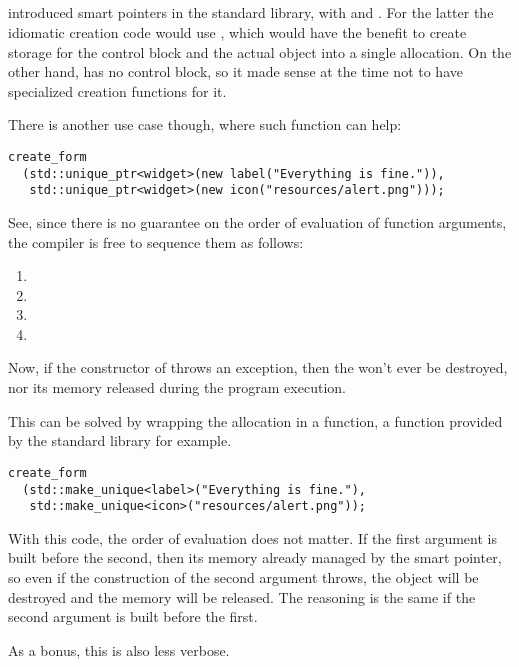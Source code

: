 \subsection{}

\problemtitle

%
%
%
 introduced smart pointers in the standard library, with
 and . For the latter
the idiomatic creation code would use , which
would have the benefit to create storage for the control block and the
actual object into a single allocation. On the other hand,
 has no control block, so it made sense at the
time not to have specialized creation functions for it.

There is another use case though, where such function can help:

\begin{lstlisting}
create_form
  (std::unique_ptr<widget>(new label("Everything is fine.")),
   std::unique_ptr<widget>(new icon("resources/alert.png")));
\end{lstlisting}

See, since there is no guarantee on the order of evaluation of
function arguments, the compiler is free to sequence them as follows:

\begin{enumerate}
\item {}
\item {}
\item {}
\item {}
\end{enumerate}

Now, if the constructor of  throws an exception, then the
 won't ever be destroyed, nor its memory released during
the program execution.

\solutiontitle

This can be solved by wrapping the allocation in a function, a
function provided by the standard library for example.

\begin{lstlisting}
create_form
  (std::make_unique<label>("Everything is fine."),
   std::make_unique<icon>("resources/alert.png"));
\end{lstlisting}

With this code, the order of evaluation does not matter. If the first
argument is built before the second, then its memory already managed
by the smart pointer, so even if the construction of the second
argument throws, the object will be destroyed and the memory will be
released. The reasoning is the same if the second argument is built
before the first.

As a bonus, this is also less verbose.
